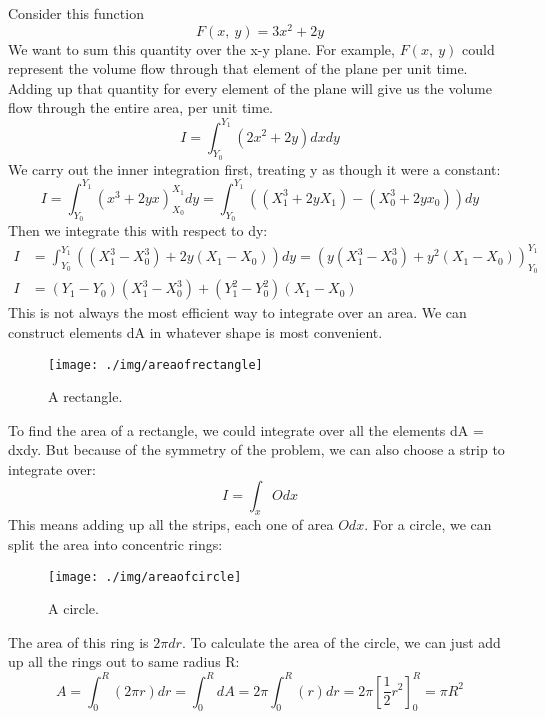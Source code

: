 Consider this function
\begin{equation}
  F(x, \ y) = 3x^2 + 2y
\end{equation}
We want to sum this quantity over the x-y plane. For example, $F(x,\ y)$ could represent the volume flow through that element of the plane per unit time. Adding up that quantity for every element of the plane will give us the volume flow through the entire area, per unit time.
\begin{equation}
  I = \int_{Y_0}^{Y_1}(2x^2 + 2y)dxdy
\end{equation}
We carry out the inner integration first, treating y as though it were a constant:
\begin{equation}
  I = \int^{Y_1}_{Y_0}\left(x^3 + 2yx \right)^{X_1}_{X_0} dy = \int_{Y_0}^{Y_1} \left( (X^3_1 +2yX_1) - (X^3_0 + 2yx_0) \right) dy
\end{equation}
Then we integrate this with respect to dy:
\begin{align}
  I & = \int_{Y_0}^{Y_1} \left( (X^3_1 - X^3_0) + 2y(X_1 - X_0) \right) dy = \left( y(X^3_1 - X^3_0) + y^2(X_1 - X_0) \right)^{Y_1}_{Y_0} \\
  I & = (Y_1 - Y_0)(X^3_1 - X^3_0) + (Y^2_1 - Y^2_0)(X_1 - X_0)
\end{align}
This is not always the most efficient way to integrate over an area. We can construct elements dA in whatever shape is most convenient.
\begin{figure}
  \centering
  \texttt{[image: ./img/areaofrectangle]}
  \caption{A rectangle.}
\end{figure}
To find the area of a rectangle, we could integrate over all the elements dA = dxdy.
But because of the symmetry of the problem, we can also choose a strip to integrate over:
\begin{equation}
  I = \int_x O dx
\end{equation}
This means adding up all the strips, each one of area $O dx$.
For a circle, we can split the area into concentric rings:
\begin{figure}
  \centering
  \texttt{[image: ./img/areaofcircle]}
  \caption{A circle.}
\end{figure}
The area of this ring is $2\pi dr$. To calculate the area of the circle, we can just add up all the rings out to same radius R:
\begin{equation}
  A = \int_0^R (2\pi r)dr = \int_0^R dA = 2\pi \int_0^R (r) dr = 2\pi \left[ \frac{1}{2} r^2 \right]^R_0 = \pi R^2
\end{equation}
